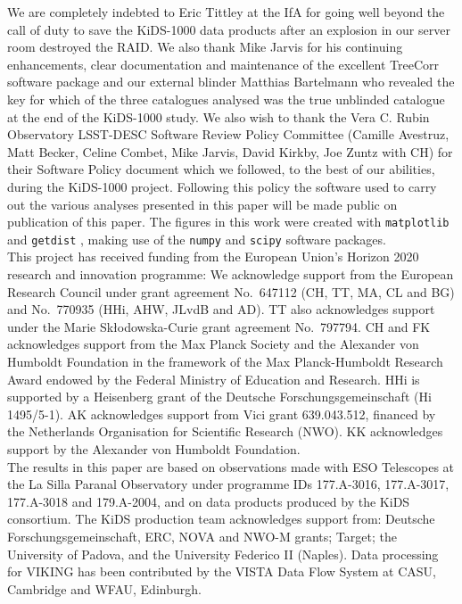 \documentclass{aa}
\newcommand{\software}[1]{\texttt{#1}}
\begin{document}
\begin{acknowledgements}
We are completely indebted to Eric Tittley at the IfA for going well beyond the call of duty to save the KiDS-1000 data products after an explosion in our server room destroyed the RAID.   We also thank
Mike Jarvis for his continuing enhancements, clear documentation and maintenance of the excellent {\sc TreeCorr} software package and our external blinder Matthias Bartelmann who revealed the key for which of the three catalogues analysed was the true unblinded catalogue at the end of the KiDS-1000 study.   We also wish to thank the Vera C. Rubin Observatory LSST-DESC Software Review Policy Committee (Camille Avestruz, Matt Becker, Celine Combet, Mike Jarvis, David Kirkby, Joe Zuntz with CH) for their Software Policy document which we followed, to the best of our abilities, during the KiDS-1000 project.   Following this policy the software used to carry out the various analyses presented in this paper will be made public on publication of this paper. 
The figures in this work were created with \software{matplotlib} \citep{Hunter2007} and \software{getdist} \citep{Lewis2019}, making use of the 
\software{numpy} \citep{Oliphant2006} and \software{scipy} \citep{Jones2001} software packages. \\

This project has received funding from the European Union's Horizon 2020 research and innovation programme: We acknowledge support from the European Research Council under grant agreement No.~647112 (CH, TT, MA, CL and BG) and No.~770935 (HHi, AHW, JLvdB and AD). TT also acknowledges support under the Marie Sk\l{}odowska-Curie grant agreement No.~797794. CH and FK acknowledges support from the Max Planck Society and the Alexander von Humboldt Foundation in the framework of the Max Planck-Humboldt Research Award endowed by the Federal Ministry of Education and Research. HHi is supported by a Heisenberg grant of the Deutsche Forschungsgemeinschaft (Hi 1495/5-1). AK acknowledges support from Vici grant 639.043.512, financed by the Netherlands Organisation for Scientific Research (NWO). KK acknowledges support by the Alexander von Humboldt Foundation.\\
%
The results in this paper are based on observations made with ESO Telescopes at the La Silla Paranal Observatory under programme IDs 177.A-3016, 177.A-3017, 177.A-3018 and 179.A-2004, and on data products produced by the KiDS consortium. The KiDS production team acknowledges support from: Deutsche Forschungsgemeinschaft, ERC, NOVA and NWO-M grants; Target; the University of Padova, and the University Federico II (Naples).  Data processing for VIKING has been contributed by the VISTA Data Flow System at CASU, Cambridge and WFAU, Edinburgh. 


\end{acknowledgements}
\end{document}
